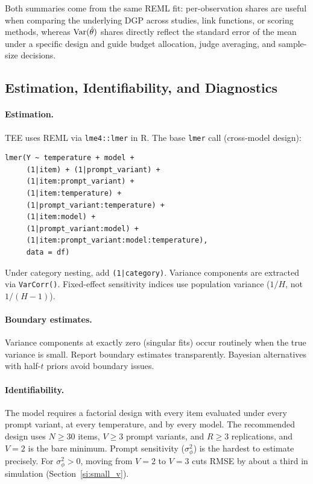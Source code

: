 Both summaries come from the same REML fit: per-observation shares are useful when comparing the underlying DGP across studies, link functions, or scoring methods, whereas $\operatorname{Var}(\hat\theta)$ shares directly reflect the standard error of the mean under a specific design and guide budget allocation, judge averaging, and sample-size decisions.

\subsection{Estimation, Identifiability, and Diagnostics}
\label{si:estimation}

\paragraph{Estimation.} TEE uses REML via \texttt{lme4::lmer} in R. The base \texttt{lmer} call (cross-model design):
\begin{verbatim}
lmer(Y ~ temperature + model +
     (1|item) + (1|prompt_variant) +
     (1|item:prompt_variant) +
     (1|item:temperature) +
     (1|prompt_variant:temperature) +
     (1|item:model) +
     (1|prompt_variant:model) +
     (1|item:prompt_variant:model:temperature),
     data = df)
\end{verbatim}
Under category nesting, add \texttt{(1|category)}. Variance components are extracted via \texttt{VarCorr()}. Fixed-effect sensitivity indices use population variance ($1/H$, not $1/(H{-}1)$).

\paragraph{Boundary estimates.} Variance components at exactly zero (singular fits) occur routinely when the true variance is small. Report boundary estimates transparently. Bayesian alternatives with half-$t$ priors \citep{gelman2006prior} avoid boundary issues.

\paragraph{Identifiability.} The model requires a factorial design with every item evaluated under every prompt variant, at every temperature, and by every model. The recommended design uses $N \geq 30$ items, $V \geq 3$ prompt variants, and $R \geq 3$ replications, and $V = 2$ is the bare minimum. Prompt sensitivity ($\sigma^2_\phi$) is the hardest to estimate precisely. For $\sigma^2_\phi > 0$, moving from $V = 2$ to $V = 3$ cuts RMSE by about a third in simulation (Section~\ref{si:small_v}).

